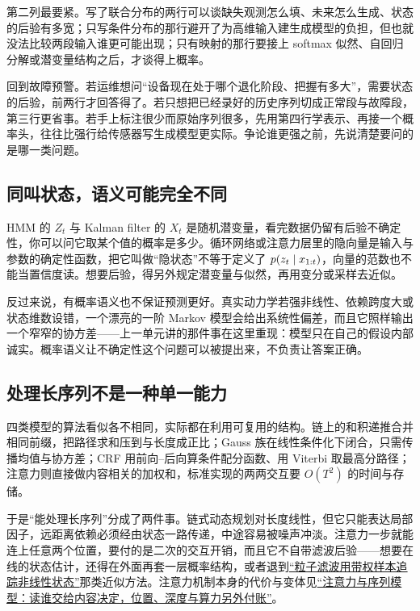 第二列最要紧。写了联合分布的两行可以谈缺失观测怎么填、未来怎么生成、状态的后验有多宽；只写条件分布的那行避开了为高维输入建生成模型的负担，但也就没法比较两段输入谁更可能出现；只有映射的那行要接上 softmax 似然、自回归分解或潜变量结构之后，才谈得上概率。

回到故障预警。若运维想问``设备现在处于哪个退化阶段、把握有多大''，需要状态的后验，前两行才回答得了。若只想把已经录好的历史序列切成正常段与故障段，第三行更省事。若手上标注很少而原始序列很多，先用第四行学表示、再接一个概率头，往往比强行给传感器写生成模型更实际。争论谁更强之前，先说清楚要问的是哪一类问题。

\subsection{同叫状态，语义可能完全不同}

HMM 的 \(Z_t\) 与 Kalman filter 的 \(X_t\) 是随机潜变量，看完数据仍留有后验不确定性，你可以问它取某个值的概率是多少。循环网络或注意力层里的隐向量是输入与参数的确定性函数，把它叫做``隐状态''不等于定义了 \(p(z_t\mid x_{1:t})\)，向量的范数也不能当置信度读。想要后验，得另外规定潜变量与似然，再用变分或采样去近似。

反过来说，有概率语义也不保证预测更好。真实动力学若强非线性、依赖跨度大或状态维数设错，一个漂亮的一阶 Markov 模型会给出系统性偏差，而且它照样输出一个窄窄的协方差——上一单元讲的那件事在这里重现：模型只在自己的假设内部诚实。概率语义让不确定性这个问题可以被提出来，不负责让答案正确。

\subsection{处理长序列不是一种单一能力}

四类模型的算法看似各不相同，实际都在利用可复用的结构。链上的和积递推合并相同前缀，把路径求和压到与长度成正比；Gauss 族在线性条件化下闭合，只需传播均值与协方差；CRF 用前向--后向算条件配分函数、用 Viterbi 取最高分路径；注意力则直接做内容相关的加权和，标准实现的两两交互要 \(O(T^2)\) 的时间与存储。

于是``能处理长序列''分成了两件事。链式动态规划对长度线性，但它只能表达局部因子，远距离依赖必须经由状态一路传递，中途容易被噪声冲淡。注意力一步就能连上任意两个位置，要付的是二次的交互开销，而且它不自带滤波后验——想要在线的状态估计，还得在外面再套一层概率结构，或者退到\hyperref[sec:13-Machine-Learning/08-Sampling-and-Inference/05]{``粒子滤波用带权样本追踪非线性状态''}那类近似方法。注意力机制本身的代价与变体见\hyperref[ch:127]{``注意力与序列模型：读谁交给内容决定，位置、深度与算力另外付账''}。

